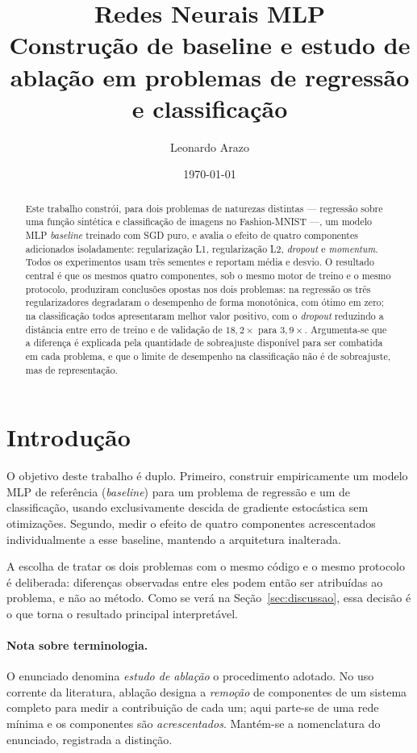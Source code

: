 \documentclass[11pt,a4paper]{article}
\title{\textbf{Redes Neurais MLP}\\[0.3em]
\large Construção de baseline e estudo de ablação em problemas de regressão e classificação}
\author{Leonardo Arazo}
\date{\today}
\begin{document}
\maketitle

\begin{abstract}
\noindent
Este trabalho constrói, para dois problemas de naturezas distintas --- regressão sobre
uma função sintética e classificação de imagens no Fashion-MNIST ---, um modelo MLP
\emph{baseline} treinado com SGD puro, e avalia o efeito de quatro componentes
adicionados isoladamente: regularização L1, regularização L2, \emph{dropout} e
\emph{momentum}. Todos os experimentos usam três sementes e reportam média e desvio.
O resultado central é que os mesmos quatro componentes, sob o mesmo motor de treino e
o mesmo protocolo, produziram conclusões opostas nos dois problemas: na regressão os
três regularizadores degradaram o desempenho de forma monotônica, com ótimo em zero;
na classificação todos apresentaram melhor valor positivo, com o \emph{dropout}
reduzindo a distância entre erro de treino e de validação de $18{,}2\times$ para
$3{,}9\times$. Argumenta-se que a diferença é explicada pela quantidade de
sobreajuste disponível para ser combatida em cada problema, e que o limite de
desempenho na classificação não é de sobreajuste, mas de representação.
\end{abstract}

\section{Introdução}

O objetivo deste trabalho é duplo. Primeiro, construir empiricamente um modelo MLP de
referência (\emph{baseline}) para um problema de regressão e um de classificação,
usando exclusivamente descida de gradiente estocástica sem otimizações. Segundo,
medir o efeito de quatro componentes acrescentados individualmente a esse baseline,
mantendo a arquitetura inalterada.

A escolha de tratar os dois problemas com o mesmo código e o mesmo protocolo é
deliberada: diferenças observadas entre eles podem então ser atribuídas ao problema, e
não ao método. Como se verá na Seção~\ref{sec:discussao}, essa decisão é o que torna o
resultado principal interpretável.

\paragraph{Nota sobre terminologia.} O enunciado denomina \emph{estudo de ablação} o
procedimento adotado. No uso corrente da literatura, ablação designa a \emph{remoção}
de componentes de um sistema completo para medir a contribuição de cada um; aqui
parte-se de uma rede mínima e os componentes são \emph{acrescentados}. Mantém-se a
nomenclatura do enunciado, registrada a distinção.
\end{document}

